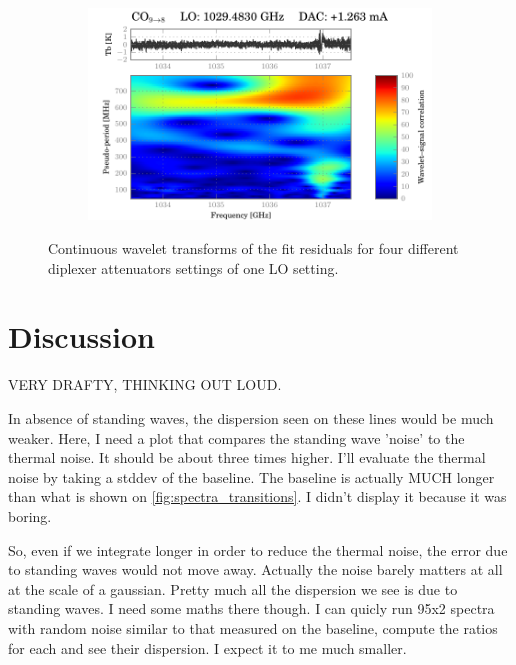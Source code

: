 \begin{figure}
\begin{subfigure}[b]{0.5\textwidth}
    \end{subfigure}%
    \hfill
    \begin{subfigure}[b]{0.5\textwidth}
        \includegraphics[width=\textwidth]{50015d89_WBS-H-USB_00-12_fit_wavelet}
    \end{subfigure}%
    \caption{
        Continuous wavelet transforms of the  fit residuals for four different diplexer attenuators settings of one LO setting.
    }
    \label{fig:wavelet_co98}
\end{figure}


\section{Discussion}
VERY DRAFTY, THINKING OUT LOUD.

In absence of standing waves, the dispersion seen on these lines would be much weaker.
Here, I need a plot that compares the standing wave 'noise' to the thermal noise.  It should be about three times higher.  I'll evaluate the thermal noise by taking a stddev of the baseline.  The baseline is actually MUCH longer than what is shown on \cref{fig:spectra_transitions}.  I didn't display it because it was boring.

So, even if we integrate longer in order to reduce the thermal noise, the error due to standing waves would not move away.  Actually the noise barely matters at all at the scale of a gaussian.  Pretty much all the dispersion we see is due to standing waves.  I need some maths there though.  I can quicly run 95x2 spectra with random noise similar to that measured on the baseline, compute the ratios for each and see their dispersion.  I expect it to me much smaller.

